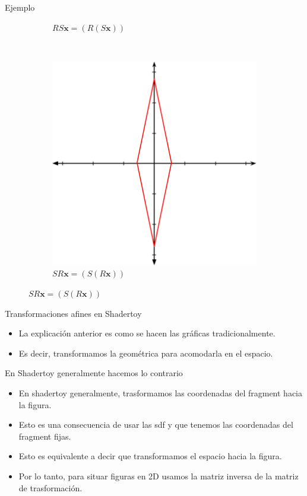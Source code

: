 \begin{frame}{Ejemplo}
\begin{figure}[htp]
\begin{subfigure}[b]{0.25\textwidth}
   \caption{$R S \mathbf{x} = ( R ( S \mathbf{x}))$}
 \end{subfigure}
 ~
 \begin{subfigure}[b]{0.25\textwidth}
   \includegraphics[width=\textwidth]{img/RoateScale}
   \caption{$S R \mathbf{x} = (S (R \mathbf{x}))$}
 \end{subfigure}
\end{figure}
\end{frame}

\begin{frame}{Transformaciones afines en Shadertoy}
\begin{itemize}
    \item La explicación anterior es como se hacen las gráficas tradicionalmente.
    \item Es decir, transformamos la geométrica para acomodarla en el espacio.
\end{itemize}
\begin{alertblock}{En Shadertoy generalmente hacemos lo contrario}
    \begin{itemize}
        \item En shadertoy generalmente, trasformamos las coordenadas del fragment hacia la figura.
        \item Esto es una consecuencia de usar las sdf y que tenemos las coordenadas del fragment fijas.
        \item Esto es equivalente a decir que transformamos el espacio hacia la figura.
        \item Por lo tanto, para situar figuras en 2D usamos la matriz inversa de la matriz de trasformación.
    \end{itemize}
\end{alertblock}
\end{frame}

